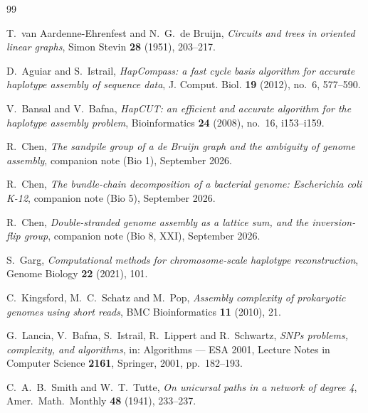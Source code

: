 \documentclass[11pt]{article}
\theoremstyle{plain}
\theoremstyle{definition}
\theoremstyle{remark}
\begin{document}
\begin{thebibliography}{99}

 T.~van Aardenne-Ehrenfest and N.~G.~de Bruijn,
\emph{Circuits and trees in oriented linear graphs},
Simon Stevin \textbf{28} (1951), 203--217.

 D.~Aguiar and S.~Istrail,
\emph{HapCompass: a fast cycle basis algorithm for accurate haplotype assembly of sequence
data}, J. Comput. Biol. \textbf{19} (2012), no.~6, 577--590.

 V.~Bansal and V.~Bafna,
\emph{HapCUT: an efficient and accurate algorithm for the haplotype assembly problem},
Bioinformatics \textbf{24} (2008), no.~16, i153--i159.

 R.~Chen, \emph{The sandpile group of a de Bruijn graph and the ambiguity of
genome assembly}, companion note (Bio 1), September 2026.

 R.~Chen, \emph{The bundle-chain decomposition of a bacterial genome:
\emph{Escherichia coli} K-12}, companion note (Bio 5), September 2026.

 R.~Chen, \emph{Double-stranded genome assembly as a lattice sum, and the
inversion-flip group}, companion note (Bio 8, XXI), September 2026.

 S.~Garg,
\emph{Computational methods for chromosome-scale haplotype reconstruction},
Genome Biology \textbf{22} (2021), 101.

 C.~Kingsford, M.~C.~Schatz and M.~Pop,
\emph{Assembly complexity of prokaryotic genomes using short reads},
BMC Bioinformatics \textbf{11} (2010), 21.

 G.~Lancia, V.~Bafna, S.~Istrail, R.~Lippert and R.~Schwartz,
\emph{SNPs problems, complexity, and algorithms},
in: Algorithms --- ESA 2001, Lecture Notes in Computer Science \textbf{2161}, Springer, 2001,
pp.~182--193.

 C.~A.~B.~Smith and W.~T.~Tutte,
\emph{On unicursal paths in a network of degree 4},
Amer.\ Math.\ Monthly \textbf{48} (1941), 233--237.

\end{thebibliography}
\end{document}
